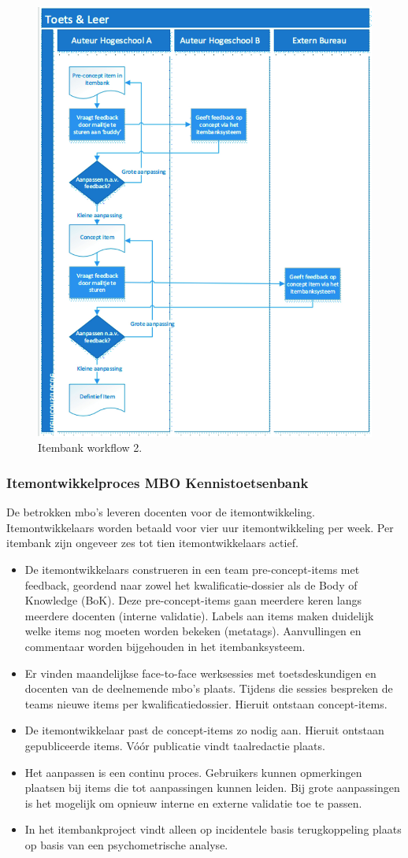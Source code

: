\documentclass[
]{book}
\providecommand{\tightlist}{%
  \setlength{\itemsep}{0pt}\setlength{\parskip}{0pt}}
\begin{document}
\begin{figure}
\includegraphics[width=0.6\linewidth]{images/toetsenleer} \caption{Itembank workflow 2.}\label{fig:unnamed-chunk-12}
\end{figure}

\hypertarget{itemontwikkelproces-mbo-kennistoetsenbank}{%
\subsubsection{Itemontwikkelproces MBO Kennistoetsenbank}\label{itemontwikkelproces-mbo-kennistoetsenbank}}

De betrokken mbo's leveren docenten voor de itemontwikkeling. Itemontwikkelaars worden betaald voor vier uur itemontwikkeling per week. Per itembank zijn ongeveer zes tot tien itemontwikkelaars actief.

\begin{itemize}
\tightlist
\item
  De itemontwikkelaars construeren in een team pre-concept-items met feedback, geordend naar zowel het kwalificatie-dossier als de Body of Knowledge (BoK). Deze pre-concept-items gaan meerdere keren langs meerdere docenten (interne validatie). Labels aan items maken duidelijk welke items nog moeten worden bekeken (metatags). Aanvullingen en commentaar worden bijgehouden in het itembanksysteem.
\item
  Er vinden maandelijkse face-to-face werksessies met toetsdeskundigen en docenten van de deelnemende mbo's plaats. Tijdens die sessies bespreken de teams nieuwe items per kwalificatiedossier. Hieruit ontstaan concept-items.
\item
  De itemontwikkelaar past de concept-items zo nodig aan. Hieruit ontstaan gepubliceerde items. Vóór publicatie vindt taalredactie plaats.
\item
  Het aanpassen is een continu proces. Gebruikers kunnen opmerkingen plaatsen bij items die tot aanpassingen kunnen leiden. Bij grote aanpassingen is het mogelijk om opnieuw interne en externe validatie toe te passen.
\item
  In het itembankproject vindt alleen op incidentele basis terugkoppeling plaats op basis van een psychometrische analyse.
\end{itemize}
\end{document}
